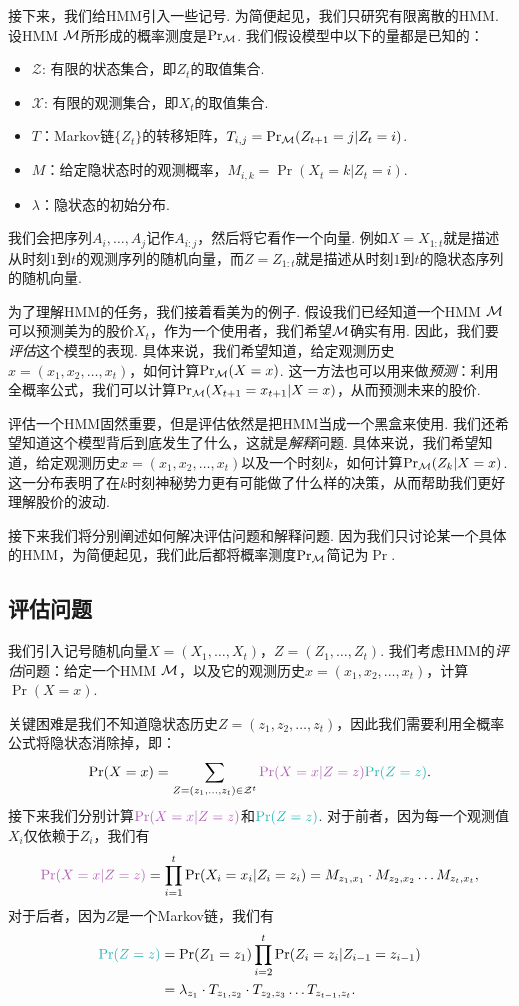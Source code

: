接下来，我们给HMM引入一些记号. 为简便起见，我们只研究有限离散的HMM. 设HMM $\mathcal M$所形成的概率测度是$\Pr_\mathcal M$. 我们假设模型中以下的量都是已知的：
\begin{itemize}
    \item $\mathcal Z$: 有限的状态集合，即$Z_t$的取值集合.
    \item $\mathcal X$: 有限的观测集合，即$X_t$的取值集合.
    \item $T$：Markov链$\{Z_t\}$的转移矩阵，$T_{i,j}=\Pr_\mathcal M(Z_{t+1}=j|Z_t=i)$.
    \item $M$：给定隐状态时的观测概率，$M_{i,k} = \Pr(X_t=k|Z_t=i)$.
    \item $\lambda$：隐状态的初始分布.
\end{itemize}

我们会把序列$A_i,\dots, A_j$记作$A_{i:j}$，然后将它看作一个向量. 例如$X=X_{1:t}$就是描述从时刻$1$到$t$的观测序列的随机向量，而$Z=Z_{1:t}$就是描述从时刻$1$到$t$的隐状态序列的随机向量.

为了理解HMM的任务，我们接着看美为的例子. 假设我们已经知道一个HMM $\mathcal M$可以预测美为的股价$X_t$，作为一个使用者，我们希望$\mathcal M$确实有用. 因此，我们要\textit{评估}这个模型的表现. 具体来说，我们希望知道，给定观测历史$x=(x_1,x_2,\dots,x_t)$，如何计算$\Pr_\mathcal M(X=x)$. 这一方法也可以用来做\textit{预测}：利用全概率公式，我们可以计算$\Pr_\mathcal M(X_{t+1}=x_{t+1}|X=x)$，从而预测未来的股价.

评估一个HMM固然重要，但是评估依然是把HMM当成一个黑盒来使用. 我们还希望知道这个模型背后到底发生了什么，这就是\textit{解释}问题. 具体来说，我们希望知道，给定观测历史$x=(x_1,x_2,\dots,x_t)$以及一个时刻$k$，如何计算$\Pr_\mathcal M(Z_k|X=x)$. 这一分布表明了在$k$时刻神秘势力更有可能做了什么样的决策，从而帮助我们更好理解股价的波动.

接下来我们将分别阐述如何解决评估问题和解释问题. 因为我们只讨论某一个具体的HMM，为简便起见，我们此后都将概率测度$\Pr_\mathcal M$简记为$\Pr$.

\subsection{评估问题}

我们引入记号随机向量$X=(X_1,\dots,X_t)$，$Z=(Z_1,\dots,Z_t)$. 我们考虑HMM的\textit{评估}问题：给定一个HMM $\mathcal M$，以及它的观测历史$x=(x_1,x_2,\dots,x_t)$，计算$\Pr(X=x)$. 

关键困难是我们不知道隐状态历史$Z=(z_1,z_2,\dots,z_t)$，因此我们需要利用全概率公式将隐状态消除掉，即：
\[
    \Pr(X=x) =\sum_{Z=(z_1, \dots, z_t) \in \mathcal Z^t} \light{\Pr(X=x|Z=z)}\contrastlight{\Pr(Z=z)}.
\]
接下来我们分别计算$\light{\Pr(X=x|Z=z)}$和$\contrastlight{\Pr(Z=z)}$. 对于前者，因为每一个观测值$X_i$仅依赖于$Z_i$，我们有
\[
    \light{\Pr(X=x|Z=z)} = \prod_{i=1}^t \Pr(X_i = x_i| Z_i = z_i) = M_{z_1,x_1}\cdot M_{z_2,x_2}\dots M_{z_t,x_t},
\]
对于后者，因为$Z$是一个Markov链，我们有
\begin{align*}
    \contrastlight{\Pr(Z=z)} &= \Pr(Z_1 = z_1) \prod_{i=2}^t\Pr(Z_i = z_i| Z_{i-1} = z_{i-1}) 
    \\
    &= \lambda_{z_1}\cdot T_{z_1,z_2}\cdot T_{z_2,z_3}\dots T_{z_{t-1},z_t}.
\end{align*}

